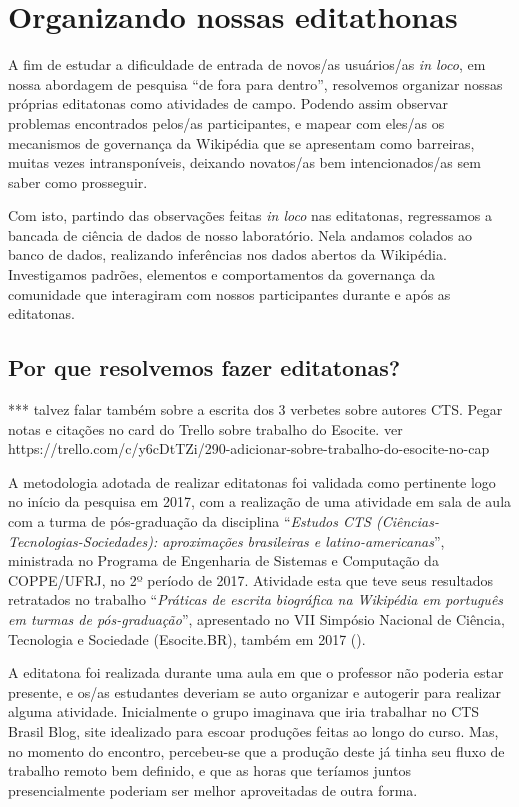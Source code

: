 \section{Organizando nossas editathonas}

A fim de estudar a dificuldade de entrada de novos/as usuários/as \textit{in loco}, em nossa abordagem de pesquisa ``de fora para dentro'', resolvemos organizar nossas próprias editatonas como atividades de campo. Podendo assim observar problemas encontrados pelos/as participantes, e mapear com eles/as os mecanismos de governança da Wikipédia que se apresentam como barreiras, muitas vezes intransponíveis, deixando novatos/as bem intencionados/as sem saber como prosseguir.

Com isto, partindo das observações feitas \textit{in loco} nas editatonas, regressamos a bancada de ciência de dados de nosso laboratório. Nela andamos colados ao banco de dados, realizando inferências nos dados abertos da Wikipédia. Investigamos padrões, elementos e comportamentos da governança da comunidade que interagiram com nossos participantes durante e após as editatonas.

\subsection{Por que resolvemos fazer editatonas?}

*** talvez falar também sobre a escrita dos 3 verbetes sobre autores CTS. Pegar notas e citações no card do Trello sobre trabalho do Esocite. ver https://trello.com/c/y6cDtTZi/290-adicionar-sobre-trabalho-do-esocite-no-cap%

A metodologia adotada de realizar editatonas foi validada como pertinente logo no início da pesquisa em 2017, com a realização de uma atividade em sala de aula com a turma de pós-graduação da disciplina ``\textit{Estudos CTS (Ciências-Tecnologias-Sociedades): aproximações brasileiras e latino-americanas}'', ministrada no Programa de Engenharia de Sistemas e Computação da COPPE/UFRJ, no 2º período de 2017. Atividade esta que teve seus resultados retratados no trabalho ``\textit{Práticas de escrita biográfica na Wikipédia em português em turmas de pós-graduação}'', apresentado no VII Simpósio Nacional de Ciência, Tecnologia e Sociedade (Esocite.BR), também em 2017 (\cite{andrade_historias_2017}).

A editatona foi realizada durante uma aula em que o professor não poderia estar presente, e os/as estudantes deveriam se auto organizar e autogerir para realizar alguma atividade. Inicialmente o grupo imaginava que iria trabalhar no CTS Brasil Blog, site idealizado para escoar produções feitas ao longo do curso. Mas, no momento do encontro, percebeu-se que a produção deste já tinha seu fluxo de trabalho remoto bem definido, e que as horas que teríamos juntos presencialmente poderiam ser melhor aproveitadas de outra forma.

